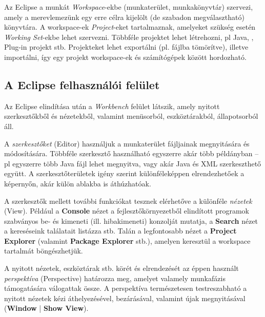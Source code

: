 Az Eclipse a munkát \emph{Workspace}-ekbe (munkaterület, munkakönyvtár) szervezi, amely a merevlemezünk egy erre célra kijelölt (de szabadon megválasztható) könyvtára. A workspace-ek \emph{Project}-eket tartalmaznak, amelyeket szükség esetén \emph{Working Set}-ekbe lehet szervezni. Többféle projektet lehet létrehozni, pl Java, \cpp, Plug-in projekt stb. Projekteket lehet exportálni (pl.  fájlba tömörítve), illetve importálni, így egy projekt workspace-ek és számítógépek között hordozható.

\subsection{A Eclipse felhasználói felület}
\label{sec:eclipse-gui}

Az Eclipse elindítása után a \emph{Workbench} felület látszik, amely nyitott szerkesztőkből és nézetekből, valamint menüsorból, eszköztárakból, állapotsorból áll.

A \emph{szerkesztőket} (Editor) használjuk a munkaterület fájljainak megnyitására és módosítására. Többféle szerkesztő használható egyszerre akár több példányban -- pl egyszerre több Java fájl lehet megnyitva, vagy akár Java és XML szerkeszthető együtt. A szerkesztőterületek igény szerint különféleképpen elrendezhetőek a képernyőn, akár külön ablakba is áthúzhatóak.

A szerkesztők mellett további funkciókat tesznek elérhetőve a különféle \emph{nézetek} (View). Például a \textbf{Console} nézet a fejlesztőkörnyezetből elindított programok szabványos be- és kimeneti (ill. hibakimeneti) konzolját mutatja, a \textbf{Search} nézet a kereséseink találatait listázza stb. Talán a legfontosabb nézet a \textbf{Project Explorer} (valamint \textbf{Package Explorer} stb.), amelyen keresztül a workspace tartalmát böngészhetjük.

A nyitott nézetek, eszköztárak stb. körét és elrendezését az éppen használt \emph{perspektíva} (Perspective) határozza meg, amelyet valamely munkafázis támogatására válogattak össze. A perspektíva természetesen testreszabható a nyitott nézetek kézi áthelyezésével, bezárásával, valamint újak megnyitásával (\textbf{Window} | \textbf{Show View}).

\begin{comment}
A nézetek elsődleges funkciója az, hogy a navigálni lehessen az információ között. Egy nézet tulajdonképpen a Workspace adatinak egy reprezentációja. Míg a szerkesztők helye kötött, nézetek bárhová helyezhetők. Saját eszköztárral is rendelkezhetnek.
\end{comment}

